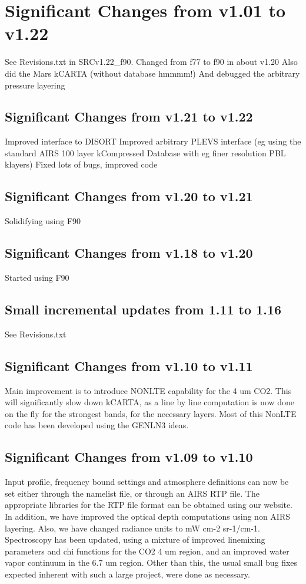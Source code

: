 \documentclass[12pt]{article}
\begin{document}
{{{{\section{Significant Changes from v1.01 to v1.22}
See Revisions.txt in SRCv1.22\_f90. Changed from f77 to f90 in about v1.20 \newline
Also did the Mars kCARTA (without database hmmmm!) \newline
And debugged the arbitrary pressure layering

\subsection{Significant Changes from v1.21 to v1.22}
Improved interface to DISORT \newline
Improved arbitrary PLEVS interface (eg using the standard AIRS 100 layer kCompressed Database with eg finer resolution PBL klayers) \newline
Fixed lots of bugs, improved code

\subsection{Significant Changes from v1.20 to v1.21}
Solidifying using F90

\subsection{Significant Changes from v1.18 to v1.20}
Started using F90

\subsection{Small incremental updates from 1.11 to 1.16}
See Revisions.txt

\subsection{Significant Changes from v1.10 to v1.11}
Main improvement is to introduce NONLTE capability for the 4 um CO2. This will
significantly slow down kCARTA, as a line by line computation is now done on
the fly for the strongest bands, for the necessary layers. Most of this 
NonLTE code has been developed using the GENLN3 ideas.

\subsection{Significant Changes from v1.09 to v1.10}
Input profile, frequency bound settings and atmosphere definitions can now be
set either through the namelist file, or through an AIRS RTP file. The 
appropriate libraries for the RTP file format can be obtained using our 
website. In addition, we have improved the optical depth computations using
non AIRS layering. Also, we have changed radiance units to mW cm-2 sr-1/cm-1.
Spectroscopy has been updated, using a mixture of improved linemixing 
parameters and chi functions for the CO2 4 um region, and an improved water
vapor continuum in the 6.7 um region. Other than this, the usual small bug 
fixes expected inherent with such a large project, were done as necessary.

}}}}
\end{document}
